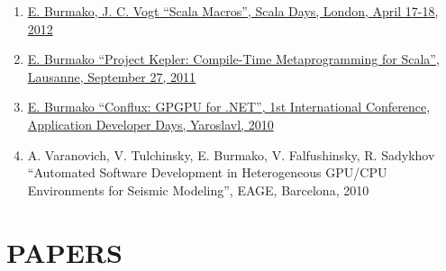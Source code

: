 \documentclass[margin, 10pt]{Stylesheet}
\begin{document}
\begin{resume}
\begin{enumerate}
\item \href{https://github.com/scalamacros/scalamacros.github.com/raw/master/paperstalks/2012-04-18-ScalaDays2012.pdf}{E. Burmako, J. C. Vogt ``Scala Macros'', Scala Days, London, April 17-18, 2012}
\item \href{https://github.com/scalamacros/scalamacros.github.com/raw/master/paperstalks/2011-09-27-ProjectKepler.pdf}{E. Burmako ``Project Kepler: Compile-Time Metaprogramming for Scala'', Lausanne, September 27, 2011}
\item \href{https://code.google.com/archive/p/conflux/downloads}{E. Burmako ``Conflux: GPGPU for .NET'', 1st International Conference, Application Developer Days, Yaroslavl, 2010}
\item A. Varanovich, V. Tulchinsky, E. Burmako, V. Falfushinsky, R. Sadykhov ``Automated Software Development in Heterogeneous GPU/CPU Environments for Seismic Modeling'', EAGE, Barcelona, 2010
\end{enumerate}

\section{PAPERS}


\end{resume}
\end{document}
